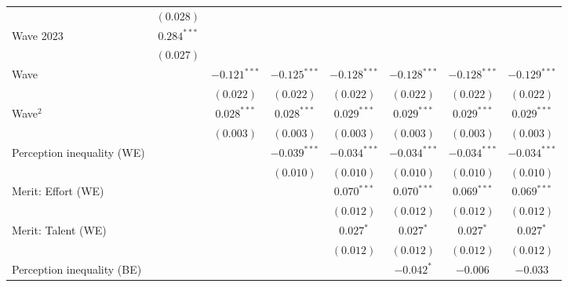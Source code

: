 \documentclass[
  12pt,
]{article}
\begin{document}
\begin{table}
{\begin{center}
{\begin{tabular}{l c c c c c c c}
                                   & $(0.028)$      &                &                &                &                &                &                \\
\quad Wave 2023                    & $0.284^{***}$  &                &                &                &                &                &                \\
                                   & $(0.027)$      &                &                &                &                &                &                \\
Wave                               &                & $-0.121^{***}$ & $-0.125^{***}$ & $-0.128^{***}$ & $-0.128^{***}$ & $-0.128^{***}$ & $-0.129^{***}$ \\
                                   &                & $(0.022)$      & $(0.022)$      & $(0.022)$      & $(0.022)$      & $(0.022)$      & $(0.022)$      \\
Wave$^2$                           &                & $0.028^{***}$  & $0.028^{***}$  & $0.029^{***}$  & $0.029^{***}$  & $0.029^{***}$  & $0.029^{***}$  \\
                                   &                & $(0.003)$      & $(0.003)$      & $(0.003)$      & $(0.003)$      & $(0.003)$      & $(0.003)$      \\
Perception inequality (WE)         &                &                & $-0.039^{***}$ & $-0.034^{***}$ & $-0.034^{***}$ & $-0.034^{***}$ & $-0.034^{***}$ \\
                                   &                &                & $(0.010)$      & $(0.010)$      & $(0.010)$      & $(0.010)$      & $(0.010)$      \\
Merit: Effort (WE)                 &                &                &                & $0.070^{***}$  & $0.070^{***}$  & $0.069^{***}$  & $0.069^{***}$  \\
                                   &                &                &                & $(0.012)$      & $(0.012)$      & $(0.012)$      & $(0.012)$      \\
Merit: Talent (WE)                 &                &                &                & $0.027^{*}$    & $0.027^{*}$    & $0.027^{*}$    & $0.027^{*}$    \\
                                   &                &                &                & $(0.012)$      & $(0.012)$      & $(0.012)$      & $(0.012)$      \\
Perception inequality (BE)         &                &                &                &                & $-0.042^{*}$   & $-0.006$       & $-0.033$       \\

\end{tabular}}
\end{center}}
\end{table}
\end{document}
